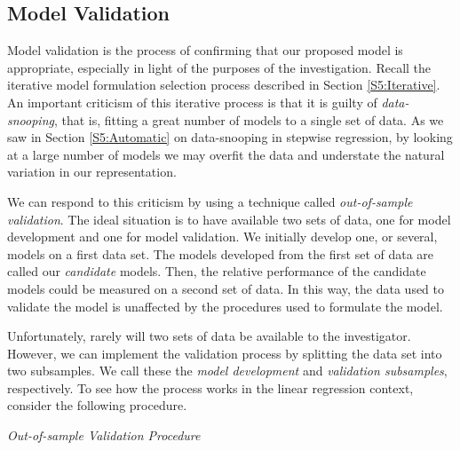 \subsection{Model Validation}\label{S5:ModelValidation}

Model validation is the process of confirming that our proposed
model is appropriate, especially in light of the purposes of the
investigation. Recall the iterative model formulation selection
process described in Section \ref{S5:Iterative}. An important
criticism of this iterative process is that it is guilty of
\emph{data-snooping}, that is, fitting a great number of models to a
single set of data. As we saw in Section \ref{S5:Automatic} on
data-snooping in stepwise regression, by looking at a large number
of models we may overfit the data and understate the natural
variation in our representation.

We can respond to this criticism by using a technique called
\textit{out-of-sample} \textit{validation}. The ideal situation is
to have available two sets of data, one for model development and
one for model validation. We initially develop one, or several,
models on a first data set. The models developed from the first set
of data are called our \emph{candidate} models. Then, the relative
performance of the candidate models could be measured on a second
set of data. In this way, the data used to validate the model is
unaffected by the procedures used to formulate the model.

Unfortunately, rarely will two sets of data be available to the
investigator. However, we can implement the validation process by
splitting the data set into two subsamples. We call these the
\textit{model development }and \textit{validation subsamples},
respectively. To see how the process works in the linear regression
context, consider the following procedure.

\bigskip
\boxedjed

\textit{Out-of-sample Validation Procedure}


